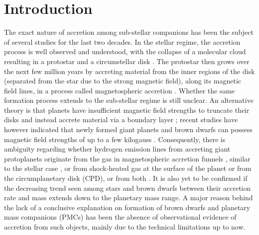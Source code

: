 \documentclass{aa}
\begin{document}

  \maketitle
%
\nolinenumbers
\section{Introduction} \label{intro}

The exact nature of accretion among sub-stellar companions has been the subject of several studies for the last two decades. In the stellar regime, the accretion process is well observed and understood, with the collapse of a molecular cloud resulting in a protostar and a circumstellar disk \citep{adams1987}. The protostar then grows over the next few million years by accreting material from the inner regions of the disk (separated from the star due to the strong magnetic field), along its magnetic field lines, in a process called magnetospheric accretion \citep{koenigl1991, hartmann1998}. Whether the same formation process extends to the sub-stellar regime is still unclear. An alternative theory is that planets have insufficient magnetic field strengths to truncate their disks and instead accrete material via a boundary layer \citep{lynden1974, owen2016}; recent studies have however indicated that newly formed giant planets and brown dwarfs can possess magnetic field strengths of up to a few kilogauss \citep{reiners2010, batygin2018, kao2018}. Consequently, there is ambiguity regarding whether hydrogen emission lines from accreting giant protoplanets originate from the gas in magnetospheric accretion funnels \citep{thanat2019}, similar to the stellar case \citep{calvet1998, muzerolle2001}, or from shock-heated gas at the surface of the planet or from the circumplanetary disk (CPD), or from both \citep{szulagyi2014, zhu2015, szulagyi2017, aoyama2018, szulagyi2020, aoyama2021}. It is also yet to be confirmed if the decreasing trend seen among stars and brown dwarfs between their accretion rate and mass \citep{rebull2000, muzerolle2003, natta2004, mohanty2005, muzerolle2005, venuti2019} extends down to the planetary mass range. A major reason behind the lack of a conclusive explanation on formation of brown dwarfs and planetary mass companions (PMCs) has been the absence of observational evidence of accretion from such objects, mainly due to the technical limitations up to now. 
\end{document}
